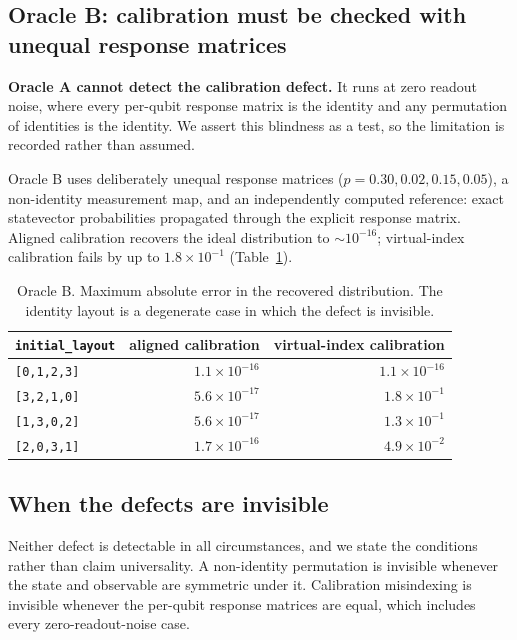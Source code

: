 \documentclass[10pt,conference]{IEEEtran}
\newcommand{\code}[1]{\texttt{\small #1}}
\begin{document}
\subsection{Oracle B: calibration must be checked with unequal response matrices}
\textbf{Oracle A cannot detect the calibration defect.} It runs at zero readout noise, where every
per-qubit response matrix is the identity and any permutation of identities is the identity. We
assert this blindness as a test, so the limitation is recorded rather than assumed.

Oracle B uses deliberately unequal response matrices ($p = 0.30, 0.02, 0.15, 0.05$), a non-identity
measurement map, and an independently computed reference: exact statevector probabilities propagated
through the explicit response matrix. Aligned calibration recovers the ideal distribution to
$\sim\!10^{-16}$; virtual-index calibration fails by up to $1.8\times10^{-1}$
(Table~\ref{tab:oracleB}).

\begin{table}[t]
\caption{Oracle B. Maximum absolute error in the recovered distribution. The identity layout is a
degenerate case in which the defect is invisible.}
\label{tab:oracleB}
\centering\small
\begin{tabular}{@{}lrr@{}}
\toprule
\code{initial\_layout} & aligned calibration & virtual-index calibration \\
\midrule
\code{[0,1,2,3]} & $1.1\times10^{-16}$ & $1.1\times10^{-16}$ \\
\code{[3,2,1,0]} & $5.6\times10^{-17}$ & $1.8\times10^{-1}$ \\
\code{[1,3,0,2]} & $5.6\times10^{-17}$ & $1.3\times10^{-1}$ \\
\code{[2,0,3,1]} & $1.7\times10^{-16}$ & $4.9\times10^{-2}$ \\
\bottomrule
\end{tabular}
\end{table}

\subsection{When the defects are invisible}
Neither defect is detectable in all circumstances, and we state the conditions rather than claim
universality. A non-identity permutation is invisible whenever the state and observable are symmetric
under it. Calibration misindexing is invisible whenever the per-qubit response matrices are equal,
which includes every zero-readout-noise case.
\end{document}
